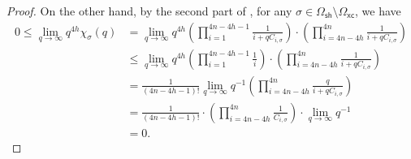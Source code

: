 \documentclass[11pt]{amsart}
\newcommand{\omsh}{\Omega_{\mathsf{sh}}}
\newcommand{\omxc}{\Omega_{\mathsf{xc}}}
\begin{document}
\begin{proof}
On the other hand, by the second part of , for any $\sigma \in \omsh \setminus \omxc$, we have
\begin{align*}
    0 \leq \lim_{q \to \infty} q^{4h} \chi_{\sigma}(q) &= \lim_{q \to \infty} q^{4h} \left(\prod_{i = 1}^{4n-4h-1} \frac{1}{i + q C_{i, \sigma}}\right) \cdot \left(\prod_{i = 4n-4h}^{4n} \frac{1}{i + q C_{i, \sigma}}\right)\\
    &\leq \lim_{q \to \infty} q^{4h} \left(\prod_{i = 1}^{4n-4h-1} \frac{1}{i}\right) \cdot \left(\prod_{i = 4n-4h}^{4n} \frac{1}{i + q C_{i, \sigma}}\right) \\
    &= \frac{1}{(4n-4h-1)!} \lim_{q \to \infty} q^{-1}  \left(\prod_{i = 4n-4h}^{4n} \frac{q}{i + q C_{i, \sigma}}\right) \\
    &= \frac{1}{(4n-4h-1)!} \cdot \left(\prod_{i = 4n-4h}^{4n} \frac{1}{C_{i, \sigma}}\right) \cdot \lim_{q \to \infty} q^{-1} \\
    &= 0.
\end{align*}


\end{proof}
\end{document}
